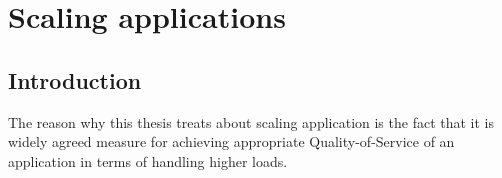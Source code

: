 \chapter{Scaling applications}

\section{Introduction}

The reason why this thesis treats about scaling application is the fact that it is widely agreed measure for achieving appropriate Quality-of-Service of an application in terms of handling higher loads.
